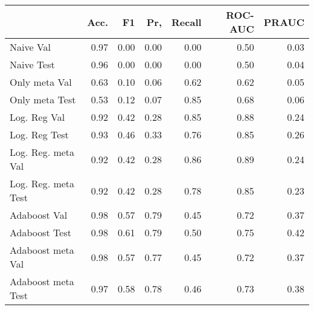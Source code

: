 \begin{tabular}{lrrrrrr}
\toprule
{} &  Acc. &    F1 &   Pr, &  Recall &  ROC-AUC &  PRAUC \\
\midrule
Naive Val           &  0.97 &  0.00 &  0.00 &    0.00 &     0.50 &   0.03 \\
Naive Test          &  0.96 &  0.00 &  0.00 &    0.00 &     0.50 &   0.04 \\
Only meta Val       &  0.63 &  0.10 &  0.06 &    0.62 &     0.62 &   0.05 \\
Only meta Test      &  0.53 &  0.12 &  0.07 &    0.85 &     0.68 &   0.06 \\
Log. Reg Val        &  0.92 &  0.42 &  0.28 &    0.85 &     0.88 &   0.24 \\
Log. Reg Test       &  0.93 &  0.46 &  0.33 &    0.76 &     0.85 &   0.26 \\
Log. Reg. meta Val  &  0.92 &  0.42 &  0.28 &    0.86 &     0.89 &   0.24 \\
Log. Reg. meta Test &  0.92 &  0.42 &  0.28 &    0.78 &     0.85 &   0.23 \\
Adaboost Val        &  0.98 &  0.57 &  0.79 &    0.45 &     0.72 &   0.37 \\
Adaboost Test       &  0.98 &  0.61 &  0.79 &    0.50 &     0.75 &   0.42 \\
Adaboost meta Val   &  0.98 &  0.57 &  0.77 &    0.45 &     0.72 &   0.37 \\
Adaboost meta Test  &  0.97 &  0.58 &  0.78 &    0.46 &     0.73 &   0.38 \\
\bottomrule
\end{tabular}
